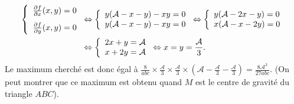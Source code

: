{{\begin{align*}\ensuremath
\left\{
\begin{array}{l}
\frac{\partial f}{\partial x}(x,y)=0\\
\rule{0mm}{6mm}\frac{\partial f}{\partial y}(x,y)=0
\end{array}
\right.&\Leftrightarrow\left\{
\begin{array}{l}
y(\mathcal{A}-x-y)-xy=0\\
y(\mathcal{A}-x-y)-xy=0
\end{array}
\right.\Leftrightarrow\left\{
\begin{array}{l}
y(\mathcal{A}-2x-y)=0\\
x(\mathcal{A}-x-2y)=0
\end{array}
\right.\\
 &\Leftrightarrow\left\{
\begin{array}{l}
2x+y=\mathcal{A}\\
x+2y=\mathcal{A}
\end{array}
\right.\Leftrightarrow x=y=\frac{\mathcal{A}}{3}.
\end{align*}
Le maximum cherché est donc égal à $\frac{8}{abc}\times\frac{\mathcal{A}}{3}\times\frac{\mathcal{A}}{3}\times\left(\mathcal{A}-\frac{\mathcal{A}}{3}-\frac{\mathcal{A}}{3}\right)=\frac{8\mathcal{A}^3}{27abc}$.
(On peut montrer que ce maximum est obtenu quand $M$ est le centre de gravité du triangle $ABC$).
}
}
